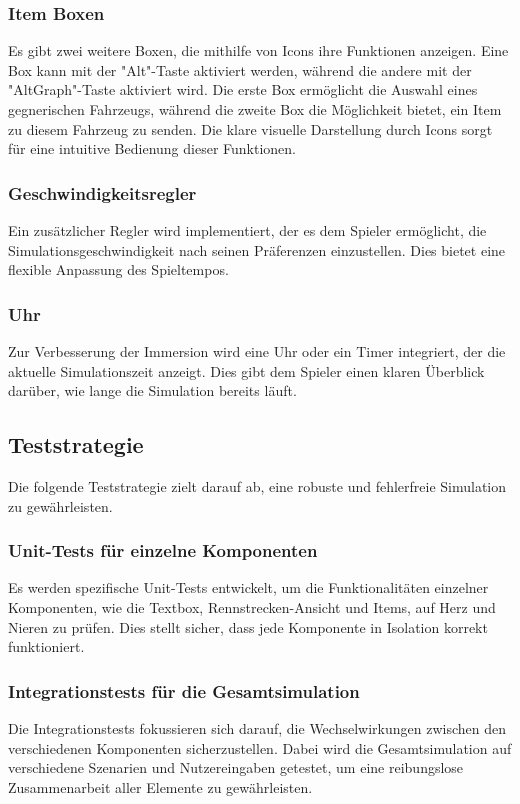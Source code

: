 \documentclass[hidelinks,12pt]{article}
\begin{document}
\subsubsection{Item Boxen}
Es gibt zwei weitere Boxen, die mithilfe von Icons ihre Funktionen anzeigen. Eine Box kann mit der "Alt"-Taste aktiviert werden, während die andere mit der "AltGraph"-Taste aktiviert wird. Die erste Box ermöglicht die Auswahl eines gegnerischen Fahrzeugs, während die zweite Box die Möglichkeit bietet, ein Item zu diesem Fahrzeug zu senden. Die klare visuelle Darstellung durch Icons sorgt für eine intuitive Bedienung dieser Funktionen.

\subsubsection{Geschwindigkeitsregler}
Ein zusätzlicher Regler wird implementiert, der es dem Spieler ermöglicht, die Simulationsgeschwindigkeit nach seinen Präferenzen einzustellen. Dies bietet eine flexible Anpassung des Spieltempos.

\subsubsection{Uhr}
Zur Verbesserung der Immersion wird eine Uhr oder ein Timer integriert, der die aktuelle Simulationszeit anzeigt. Dies gibt dem Spieler einen klaren Überblick darüber, wie lange die Simulation bereits läuft.

\subsection{Teststrategie}
Die folgende Teststrategie zielt darauf ab, eine robuste und fehlerfreie Simulation zu gewährleisten.

\subsubsection{Unit-Tests für einzelne Komponenten}
Es werden spezifische Unit-Tests entwickelt, um die Funktionalitäten einzelner Komponenten, wie die Textbox, Rennstrecken-Ansicht und Items, auf Herz und Nieren zu prüfen. Dies stellt sicher, dass jede Komponente in Isolation korrekt funktioniert.

\subsubsection{Integrationstests für die Gesamtsimulation}
Die Integrationstests fokussieren sich darauf, die Wechselwirkungen zwischen den verschiedenen Komponenten sicherzustellen. Dabei wird die Gesamtsimulation auf verschiedene Szenarien und Nutzereingaben getestet, um eine reibungslose Zusammenarbeit aller Elemente zu gewährleisten.
\end{document}
